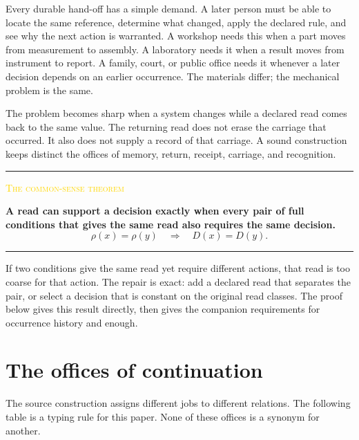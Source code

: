\documentclass[11pt]{article}
\newcommand{\smallcaps}[1]{{\footnotesize\textsc{#1}}}
\newenvironment{claimbox}[1]{%
  \par\vspace{0.55em}\noindent\begin{minipage}{\linewidth}
  \color{line}\rule{\linewidth}{0.55pt}\par\vspace{0.34em}%
  \textcolor{gold}{\smallcaps{#1}}\par\vspace{0.3em}\color{ink}%
}{%
  \par\vspace{0.38em}\color{line}\rule{\linewidth}{0.55pt}%
  \end{minipage}\par\vspace{0.55em}%
}
\begin{document}
Every durable hand-off has a simple demand. A later person must be able to locate the same reference, determine what changed, apply the declared rule, and see why the next action is warranted. A workshop needs this when a part moves from measurement to assembly. A laboratory needs it when a result moves from instrument to report. A family, court, or public office needs it whenever a later decision depends on an earlier occurrence. The materials differ; the mechanical problem is the same.

The problem becomes sharp when a system changes while a declared read comes back to the same value. The returning read does not erase the carriage that occurred. It also does not supply a record of that carriage. A sound construction keeps distinct the offices of memory, return, receipt, carriage, and recognition.

\begin{claimbox}{The common-sense theorem}
\textbf{A read can support a decision exactly when every pair of full conditions that gives the same read also requires the same decision.}
\[
\rho(x)=\rho(y)\quad\Longrightarrow\quad D(x)=D(y).
\tag{1}\label{eq:plain}
\]
\end{claimbox}

If two conditions give the same read yet require different actions, that read is too coarse for that action. The repair is exact: add a declared read that separates the pair, or select a decision that is constant on the original read classes. The proof below gives this result directly, then gives the companion requirements for occurrence history and enough.

\section{The offices of continuation}

The source construction assigns different jobs to different relations. The following table is a typing rule for this paper. None of these offices is a synonym for another.
\end{document}

